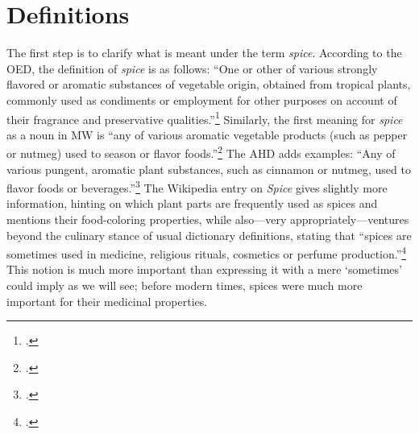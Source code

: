 


\section{Definitions}
\label{sec:definitions}

The first step is to clarify what is meant under the term \textit{spice}. According to the \gls{OED}, the definition of \textit{spice} is as follows: ``One or other of various strongly flavored or aromatic substances of vegetable origin, obtained from tropical plants, commonly used as condiments or employment for other purposes on account of their fragrance and preservative qualities.''\footcite[spice]{oed} Similarly, the first meaning for \textit{spice} as a noun in \gls{MW} is ``any of various aromatic vegetable products (such as pepper or nutmeg) used to season or flavor foods.''\footcite[spice]{mw} The \gls{AHD} adds examples: ``Any of various pungent, aromatic plant substances, such as cinnamon or nutmeg, used to flavor foods or beverages.''\footcite[spice]{ahd} 
The Wikipedia entry on \textit{Spice} gives slightly more information, hinting on which plant parts are frequently used as spices and mentions their food-coloring properties, while also---very appropriately---ventures beyond the culinary stance of usual dictionary definitions, stating that ``spices are sometimes used in medicine, religious rituals, cosmetics or perfume production.''\footcite{wikipedia_spice_2022} This notion is much more important than expressing it with a mere `sometimes' could imply as we will see; before modern times, spices were much more important for their medicinal properties.

